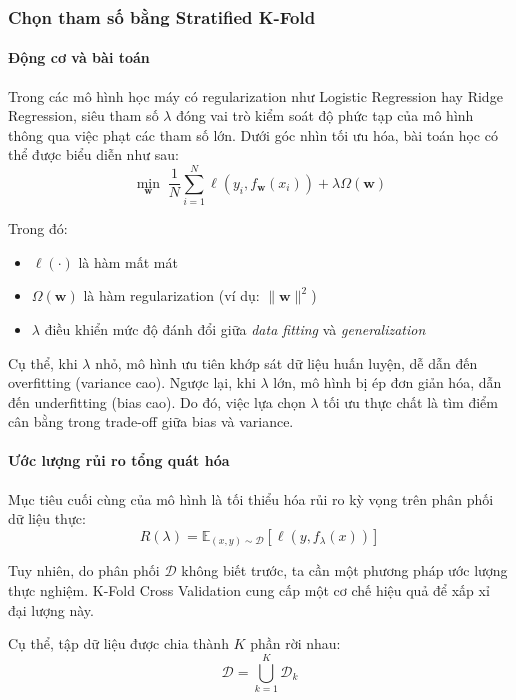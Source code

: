 \subsubsection{Chọn tham số bằng Stratified K-Fold}

\paragraph{Động cơ và bài toán}

Trong các mô hình học máy có regularization như Logistic Regression hay Ridge Regression, siêu tham số $\lambda$ đóng vai trò kiểm soát độ phức tạp của mô hình thông qua việc phạt các tham số lớn. Dưới góc nhìn tối ưu hóa, bài toán học có thể được biểu diễn như sau:
\[
\min_{\boldsymbol{w}} \; \frac{1}{N} \sum_{i=1}^{N} \ell(y_i, f_{\boldsymbol{w}}(x_i)) + \lambda \Omega(\boldsymbol{w})
\]

Trong đó:
\begin{itemize}
    \item $\ell(\cdot)$ là hàm mất mát
    \item $\Omega(\boldsymbol{w})$ là hàm regularization (ví dụ: $\|\boldsymbol{w}\|^2$)
    \item $\lambda$ điều khiển mức độ đánh đổi giữa \textit{data fitting} và \textit{generalization}
\end{itemize}

Cụ thể, khi $\lambda$ nhỏ, mô hình ưu tiên khớp sát dữ liệu huấn luyện, dễ dẫn đến overfitting (variance cao). Ngược lại, khi $\lambda$ lớn, mô hình bị ép đơn giản hóa, dẫn đến underfitting (bias cao). Do đó, việc lựa chọn $\lambda$ tối ưu thực chất là tìm điểm cân bằng trong trade-off giữa bias và variance.

\paragraph{Ước lượng rủi ro tổng quát hóa}

Mục tiêu cuối cùng của mô hình là tối thiểu hóa rủi ro kỳ vọng trên phân phối dữ liệu thực:
\[
R(\lambda) = \mathbb{E}_{(x,y)\sim \mathcal{D}} \left[ \ell(y, f_{\lambda}(x)) \right]
\]

Tuy nhiên, do phân phối $\mathcal{D}$ không biết trước, ta cần một phương pháp ước lượng thực nghiệm. K-Fold Cross Validation cung cấp một cơ chế hiệu quả để xấp xỉ đại lượng này.

Cụ thể, tập dữ liệu được chia thành $K$ phần rời nhau:
\[
\mathcal{D} = \bigcup_{k=1}^{K} \mathcal{D}_k
\]

